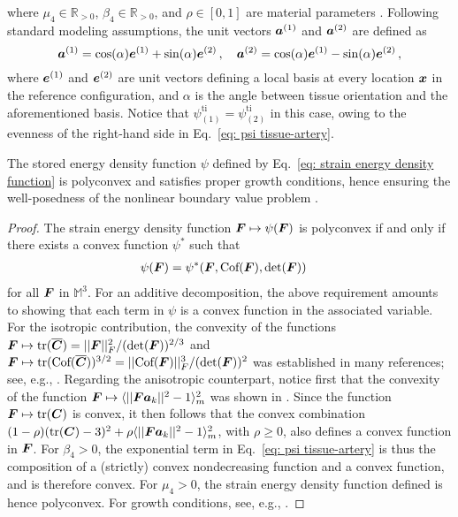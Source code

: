 where $\mu_4 \in \mathbb{R}_{> 0}$, $\beta_4 \in \mathbb{R}_{> 0}$, and $\rho \in [0,1]$ are material parameters \cite{holzapfel2005determination}. Following standard modeling assumptions, the unit vectors $\boldsymbol{a}^{(1)}$ and $\boldsymbol{a}^{(2)}$ are defined as
\begin{equation}    
    \boldsymbol{a}^{(1)} = \cos(\alpha) \boldsymbol{e}^{(1)} + \sin(\alpha)\boldsymbol{e}^{(2)}\,, \quad 
    \boldsymbol{a}^{(2)} = \cos(\alpha) \boldsymbol{e}^{(1)} - \sin(\alpha)\boldsymbol{e}^{(2)}\,,
\end{equation}
where $\boldsymbol{e}^{(1)}$ and $\boldsymbol{e}^{(2)}$ are unit vectors defining a local basis at every location $\boldsymbol{x}$ in the reference configuration, and $\alpha$ is the angle between tissue orientation and the aforementioned basis. Notice that $\psi_{(1)}^\text{ti} = \psi_{(2)}^\text{ti}$ in this case, owing to the evenness of the right-hand side in Eq.~\eqref{eq: psi tissue-artery}.

\begin{prop}
The stored energy density function $\psi$ defined by Eq.~\eqref{eq: strain energy density function} is polyconvex and satisfies proper growth conditions, hence ensuring the well-posedness of the nonlinear boundary value problem \cite{Ciarlet1988,ball2002some}.
\end{prop}

\begin{proof} 
The strain energy density function $\boldsymbol{F} \mapsto \psi(\boldsymbol{F})$ is polyconvex if and only if there exists a convex function $\psi^*$ such that
\begin{align}
    \psi(\boldsymbol{F}) & = \psi^*(\boldsymbol{F}, \text{Cof}(\boldsymbol{F}), \det(\boldsymbol{F}))
\end{align}
for all $\boldsymbol{F}$ in $\mathbb{M}^3$. For an additive decomposition, the above requirement amounts to showing that each term in $\psi$ is a convex function in the associated variable. For the isotropic contribution, the convexity of the functions $\boldsymbol{F} \mapsto \textnormal{tr}(\overline{\boldsymbol{C}}) = \vert \vert \boldsymbol{F} \vert \vert_F^2/(\det(\boldsymbol{F}))^{2/3}$ and $\boldsymbol{F} \mapsto \textnormal{tr}(\text{Cof}(\overline{\boldsymbol{C}}))^{3/2} = \vert \vert \text{Cof}(\boldsymbol{F}) \vert \vert_F^3/(\det(\boldsymbol{F}))^2$ was established in many references; see, e.g., \cite{hartmann2003polyconvexity,schroder2003invariant}. Regarding the anisotropic counterpart, notice first that the convexity of the function $\boldsymbol{F} \mapsto \langle \vert \vert \boldsymbol{F} \boldsymbol{a}_k \vert \vert ^2-1 \rangle^2_m$ was shown in \cite{balzani2006polyconvex}. Since the function $\boldsymbol{F} \mapsto \textnormal{tr}(\boldsymbol{C})$ is convex, it then follows that the convex combination $(1-\rho)(\textnormal{tr}(\boldsymbol{C})-3)^2 + \rho \langle \vert \vert \boldsymbol{F} \boldsymbol{a}_k \vert \vert ^2-1 \rangle^2_m$, with $\rho \geq 0$,  also defines a convex function in $\boldsymbol{F}$. For $\beta_4 > 0$, the exponential term in Eq.~\eqref{eq: psi tissue-artery} is thus the composition of a (strictly) convex nondecreasing function and a convex function, and is therefore convex. For $\mu_4 > 0$, the strain energy density function defined is hence polyconvex. For growth conditions, see, e.g., \cite{ball2002some}.
\end{proof}

